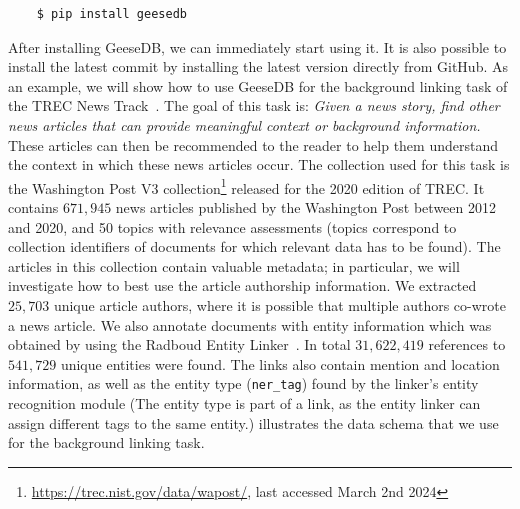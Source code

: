 \begin{verbatim}
	$ pip install geesedb
\end{verbatim}
After installing GeeseDB, we can immediately start using it. It is also possible to install the latest commit by installing the latest version directly from GitHub.
As an example, we will show how to use GeeseDB for the background linking task of the TREC News Track~\citep{soboroff2018trec}. The goal of this task is: \textit{Given a news story, find other news articles that can provide meaningful context or background information.} These articles can then be recommended to the reader to help them understand the context in which these news articles occur. The collection used for this task is the Washington Post V3 collection\footnote{\url{https://trec.nist.gov/data/wapost/}, last accessed March 2nd 2024} released for the 2020 edition of TREC. It contains $671,945$ news articles published by the Washington Post between 2012 and 2020, and 50 topics with relevance assessments (topics correspond to collection identifiers of documents for which relevant data has to be found). The articles in this collection contain valuable metadata; in particular, we will investigate how to best use the article authorship information. We extracted $25,703$ unique article authors, where it is possible that multiple authors co-wrote a news article. We also annotate documents with entity information which was obtained by using the Radboud Entity Linker~\citep{rel}. In total $31,622,419$ references to $541,729$ unique entities were found. The links also contain mention and location information, as well as the entity type (\texttt{ner\_tag}) found by the linker's entity recognition module (The entity type is part of a link, as the entity linker can assign different tags to the same entity.)  illustrates the data schema that we use for the background linking task. 

